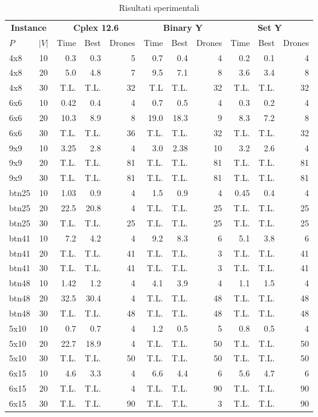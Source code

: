 \setlength{\tabcolsep}{3.5 pt}
\renewcommand\arraystretch{1.1}
\begin{table} 
	\scriptsize
	\center
	\begin{tabular}{lc|rrr|rrr|rrr}
		\hline
		\multicolumn{2}{c}{\bf Instance} & \multicolumn{3}{|c}{{\bf Cplex 12.6}} & \multicolumn{3}{|c}{{\bf Binary Y}} & \multicolumn{3}{|c}{{\bf Set Y}}\\
		{\bf $P$} & $|V|$ & Time & Best & Drones & Time & Best & Drones & Time & Best & Drones \\
		\hline
		4x8 & 10 & 0.3 & 0.3 & 5 & 0.7 & 0.4 & 4 & 0.2 & 0.1 & 4 \\
		4x8 & 20 & 5.0 & 4.8 & 7 & 9.5 & 7.1 & 8 & 3.6 & 3.4 & 8 \\
		4x8 & 30 & T.L. & T.L. & 32 & T.L & T.L. & 32 & T.L. & T.L. & 32 \\
		6x6 & 10 & 0.42 & 0.4 & 4 & 0.7 & 0.5 & 4 & 0.3 & 0.2 & 4 \\
		6x6 & 20 & 10.3 & 8.9 & 8 & 19.0 & 18.3 & 9 & 8.3 & 7.2 & 8 \\
		6x6 & 30 & T.L. & T.L. & 36 & T.L. & T.L. & 32 & T.L. & T.L. & 32 \\
		9x9 & 10 & 3.25 & 2.8 & 4 & 3.0 & 2.38 & 10 & 3.2 & 2.6 & 4 \\
		9x9 & 20 & T.L. & T.L. & 81 & T.L. & T.L. & 81 & T.L. & T.L. & 81 \\
		9x9 & 30 & T.L. & T.L. & 81 & T.L. & T.L. & 81 & T.L. & T.L. & 81 \\
		btn25 & 10 & 1.03 & 0.9 & 4 & 1.5 & 0.9 & 4 & 0.45 & 0.4 & 4 \\
		btn25 & 20 & 22.5 & 20.8 & 4 & T.L. & T.L. & 25 & T.L. & T.L. & 25 \\
		btn25 & 30 & T.L. & T.L. & 25 & T.L. & T.L. & 25 & T.L. & T.L. & 25 \\
		btn41 & 10 & 7.2 & 4.2 & 4 & 9.2 & 8.3 & 6 & 5.1 & 3.8 & 6 \\
		btn41 & 20 & T.L. & T.L. & 41 & T.L. & T.L. & 3 & T.L. & T.L. & 41 \\
		btn41 & 30 & T.L. & T.L. & 41 & T.L. & T.L. & 3 & T.L. & T.L. & 41 \\
		btn48 & 10 & 1.42 & 1.2 & 4 & 4.1 & 3.9 & 4 & 1.1 & 1.5 & 4 \\
		btn48 & 20 & 32.5 & 30.4 & 4 & T.L. & T.L. & 48 & T.L. & T.L. & 48 \\
		btn48 & 30 & T.L. & T.L. & 48 & T.L. & T.L. & 48 & T.L. & T.L. & 48 \\
		5x10 & 10 & 0.7 & 0.7 & 4 & 1.2 & 0.5 & 5 & 0.8 & 0.5 & 4 \\
		5x10 & 20 & 22.7 & 18.9 & 4 & T.L. & T.L. & 50 & T.L. & T.L. & 50 \\
		5x10 & 30 & T.L. & T.L. & 50 & T.L. & T.L. & 50 & T.L. & T.L. & 50 \\
		6x15 & 10 & 4.6 & 3.3 & 4 & 6.6 & 4.4 & 6 & 5.6 & 4.7 & 6 \\
		6x15 & 20 & T.L. & T.L. & 4 & T.L. & T.L. & 90 & T.L. & T.L. & 90 \\
		6x15 & 30 & T.L. & T.L. & 90 & T.L. & T.L. & 3 & T.L. & T.L. & 90 \\
		\hline
	\end{tabular}
	\normalsize
	\caption{Risultati sperimentali} 
	\label{tabRes}
\end{table}
%